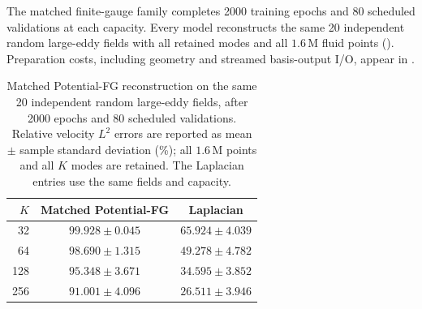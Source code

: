 The matched finite-gauge family completes 2000 training epochs and 80 scheduled validations at each capacity. Every model reconstructs the same 20 independent random large-eddy fields with all retained modes and all $1.6\,\mathrm{M}$ fluid points (). Preparation costs, including geometry and streamed basis-output I/O, appear in .


\begin{table}[!htb]\centering\small
\caption{Matched Potential-FG reconstruction on the same 20 independent random large-eddy fields, after 2000 epochs and 80 scheduled validations. Relative velocity $L^2$ errors are reported as mean $\pm$ sample standard deviation (\%); all $1.6\,\mathrm{M}$ points and all $K$ modes are retained. The Laplacian entries use the same fields and capacity.}
\label{tab:matched-FG-NEW20-values}
\begin{tabular}{rcc}\toprule
$K$&Matched Potential-FG&Laplacian\\\midrule
32&$99.928\pm0.045$&$65.924\pm4.039$\\
64&$98.690\pm1.315$&$49.278\pm4.782$\\
128&$95.348\pm3.671$&$34.595\pm3.852$\\
256&$91.001\pm4.096$&$26.511\pm3.946$\\
\bottomrule\end{tabular}
\end{table}
